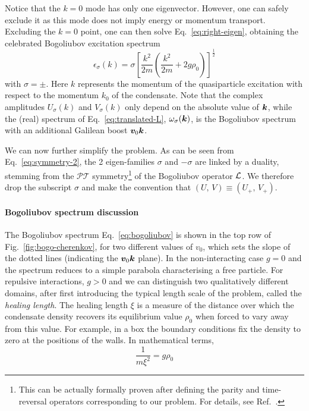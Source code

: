 Notice that the $k=0$ mode has only one eigenvector. However, one can
safely exclude it as this mode does not imply energy or momentum
transport. Excluding the $k = 0$ point, one can then solve
Eq.~\eqref{eq:right-eigen}, obtaining the celebrated Bogoliubov
excitation spectrum
%
\begin{equation}\label{eq:bogoliubov}
  \epsilon_\sigma(k) = \sigma \left[\frac{k^2}{2m}\left(\frac{k^2}{2m} + 2 g \rho_0 \right) \right]^{\frac{1}{2}}
\end{equation}
% 
with $\sigma = \pm$. Here $k$ represents the momentum of the
quasiparticle excitation with respect to the momentum $k_0$ of the
condensate. Note that the complex amplitudes $U_\sigma(k)$ and
$V_\sigma(k)$ only depend on the absolute value of $\bm{k}$, while the
(real) spectrum of Eq.~\eqref{eq:translated-L}, $\omega_\sigma(\bm{k})$,
is the Bogoliubov spectrum with an additional Galilean boost
$\bm{v}_0 \bm{k}$.

We can now further simplify the problem. As can be seen from
Eq.~\eqref{eq:symmetry-2}, the 2 eigen-families $\sigma$ and $-\sigma$
are linked by a duality, stemming from the $\mathcal{P} \mathcal{T}$
symmetry\footnote{This can be actually formally proven after defining
  the parity and time-reversal operators corresponding to our
  problem. For details, see Ref.~\cite{MOSTAFAZADEH_2010}.} of the
Bogoliubov operator $\mathcal{L}$.  We therefore drop the subscript $\sigma$
and make the convention that
$\left( U,\, V \right) \equiv \left( U_{+},\, V_{+} \right)$.

\paragraph{Bogoliubov spectrum discussion}
The Bogoliubov spectrum Eq.~\eqref{eq:bogoliubov} is shown in the top
row of Fig.~\ref{fig:bogo-cherenkov}, for two different values of
$v_0$, which sets the slope of the dotted lines (indicating the
$\bm{v}_0 \bm{k}$ plane). In the non-interacting case $g=0$ and the
spectrum reduces to a simple parabola characterising a free
particle. For repulsive interactions, $g > 0$ and we can distinguish
two qualitatively different domains, after first introducing the
typical length scale of the problem, called the \textit{healing
  length}. The healing length $\xi$ is a measure of the distance over
which the condensate density recovers its equilibrium value $\rho_0$
when forced to vary away from this value. For example, in a box the
boundary conditions fix the density to zero at the positions of the
walls. In mathematical terms,
%
\begin{equation}\label{eq:healing-length}
  \frac{1}{m\xi^2}=g\rho_0
\end{equation}
% 

